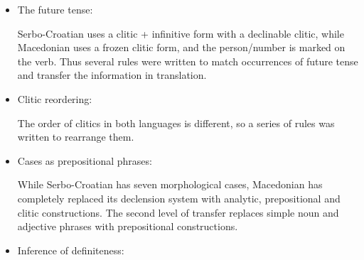 \documentclass{book}
\begin{document}
\begin{itemize}
\item The future tense:

Serbo-Croatian uses a clitic + infinitive form with a declinable clitic, while
Macedonian uses a frozen clitic form, and the person/number is marked on the verb.
Thus several rules were written to match occurrences of future tense
and transfer the information in translation.

\pagebreak

\item Clitic reordering:


The order of clitics in both languages is different, so a series of rules was written to rearrange them.


\item Cases as prepositional phrases:


While Serbo-Croatian has seven morphological cases, Macedonian has 
completely replaced its declension system with analytic, prepositional and clitic constructions.
The second level of transfer replaces simple noun and adjective phrases with prepositional constructions.

\item Inference of definiteness:

\enumsentence{

}
\end{itemize}
\end{document}

